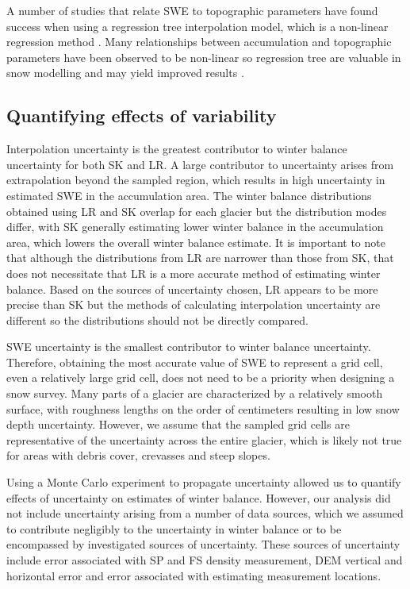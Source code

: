 \documentclass[review,oneside, letterpaper]{igs}
\begin{document}
A number of studies that relate SWE to topographic parameters have found success when using a regression tree interpolation model, which is a non-linear regression method \citep[e.g.][]{Elder1998, Erickson2005, Lopez2010}. Many relationships between accumulation and topographic parameters have been observed to be non-linear so regression tree are valuable in snow modelling and may yield improved results \citep{Erxleben2002, Molotch2005}. 

\subsection{Quantifying effects of variability}

Interpolation uncertainty is the greatest contributor to winter balance uncertainty for both SK and LR. A large contributor to uncertainty arises from extrapolation beyond the sampled region, which results in high uncertainty in estimated SWE in the accumulation area. The winter balance distributions obtained using LR and SK overlap for each glacier but the distribution modes differ, with SK generally estimating lower winter balance in the accumulation area, which lowers the overall winter balance estimate. It is important to note that although the distributions from LR are narrower than those from SK, that does not necessitate that LR is a more accurate method of estimating winter balance. Based on the sources of uncertainty chosen, LR appears to be more precise than SK but the methods of calculating interpolation uncertainty are different so the distributions should not be directly compared. 

SWE uncertainty is the smallest contributor to winter balance uncertainty. Therefore, obtaining the most accurate value of SWE to represent a grid cell, even a relatively large grid cell, does not need to be a priority when designing a snow survey. Many parts of a glacier are characterized by a relatively smooth surface, with roughness lengths on the order of centimeters \citep{Hock2005} resulting in low snow depth uncertainty. However, we assume that the sampled grid cells are representative of the uncertainty across the entire glacier, which is likely not true for areas with debris cover, crevasses and steep slopes. 

Using a Monte Carlo experiment to propagate uncertainty allowed us to quantify effects of uncertainty on estimates of winter balance. However, our analysis did not include uncertainty arising from a number of data sources, which we assumed to contribute negligibly to the uncertainty in winter balance or to be encompassed by investigated sources of uncertainty. These sources of uncertainty include error associated with SP and FS density measurement, DEM vertical and horizontal error and error associated with estimating measurement locations.
\end{document}

